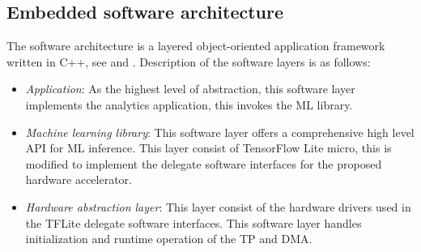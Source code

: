\subsection{Embedded software architecture}
The software architecture is a layered object-oriented application framework written in C++, see  and . Description of the software layers is as follows:
\begin{itemize}
	\item \emph{Application}: As the highest level of abstraction, this software layer implements the analytics application, this invokes the ML library.
	\item \emph{Machine learning library}: This software layer offers a comprehensive high level API for ML inference. This layer consist of TensorFlow Lite micro, this is modified to implement the delegate software interfaces for the proposed hardware accelerator.
	\item \emph{Hardware abstraction layer}: This layer consist of the hardware drivers used in the TFLite delegate software interfaces. This software layer handles initialization and runtime operation of the TP and DMA.
\end{itemize}